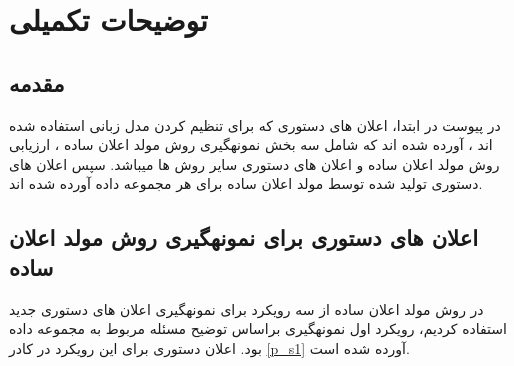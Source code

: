 
\chapter*{توضیحات تکمیلی}
\section*{مقدمه}
در پیوست در ابتدا، اعلان های دستوری که برای تنظیم کردن مدل زبانی استفاده شده اند ، آورده شده اند که شامل سه بخش نمونه\/گیری روش مولد اعلان ساده ، ارزیابی روش مولد اعلان ساده و اعلان های دستوری سایر روش ها می\/باشد. سپس اعلان های دستوری تولید شده توسط مولد اعلان ساده برای هر مجموعه داده آورده شده اند.

\section*{اعلان های دستوری برای نمونه\/گیری روش مولد اعلان ساده}

در روش مولد اعلان ساده از سه رویکرد برای نمونه\/گیری اعلان های دستوری جدید استفاده کردیم، رویکرد اول نمونه\/گیری براساس توضیح مسئله مربوط به مجموعه داده بود. اعلان دستوری برای این رویکرد در کادر \ref{p_s1} آورده شده است.

